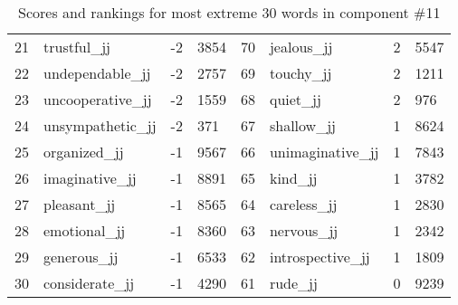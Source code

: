 \begin{table}[tbp]
\begin{tabular}{| rlr@{.}l | rlr@{.}l |}
    21 & trustful\_jj & -2 & 3854    &    70 & jealous\_jj & 2 & 5547 \\
    22 & undependable\_jj & -2 & 2757    &    69 & touchy\_jj & 2 & 1211 \\
    23 & uncooperative\_jj & -2 & 1559    &    68 & quiet\_jj & 2 & 976 \\
    24 & unsympathetic\_jj & -2 & 371    &    67 & shallow\_jj & 1 & 8624 \\
    25 & organized\_jj & -1 & 9567    &    66 & unimaginative\_jj & 1 & 7843 \\
    26 & imaginative\_jj & -1 & 8891    &    65 & kind\_jj & 1 & 3782 \\
    27 & pleasant\_jj & -1 & 8565    &    64 & careless\_jj & 1 & 2830 \\
    28 & emotional\_jj & -1 & 8360    &    63 & nervous\_jj & 1 & 2342 \\
    29 & generous\_jj & -1 & 6533    &    62 & introspective\_jj & 1 & 1809 \\
    30 & considerate\_jj & -1 & 4290    &    61 & rude\_jj & 0 & 9239 \\
    \hline
    \end{tabular}
    \caption{Scores and rankings for most extreme 30 words in component \#11} 
\end{table}
\clearpage
